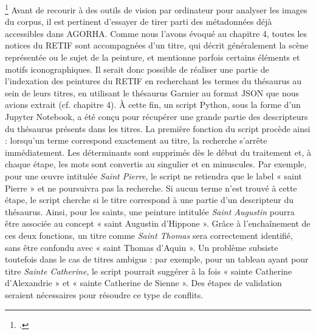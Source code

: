 \footcite{Exploiter les métadonnées existantes}
Avant de recourir à des outils de vision par ordinateur pour analyser les images du corpus, il est pertinent d’essayer de tirer parti des métadonnées déjà accessibles dans AGORHA. Comme nous l’avons évoqué au chapitre 4, toutes les notices du RETIF sont accompagnées d’un titre, qui décrit généralement la scène représentée ou le sujet de la peinture, et mentionne parfois certains éléments et motifs iconographiques. Il serait donc possible de réaliser une partie de l’indexation des peintures du RETIF en recherchant les termes du thésaurus au sein de leurs titres, en utilisant le thésaurus Garnier au format JSON que nous avions extrait (cf. chapitre 4). À cette fin, un script Python, sous la forme d’un Jupyter Notebook, a été conçu pour récupérer une grande partie des descripteurs du thésaurus présents dans les titres. La première fonction du script procède ainsi : lorsqu’un terme correspond exactement au titre, la recherche s’arrête immédiatement. Les déterminants sont supprimés dès le début du traitement et, à chaque étape, les mots sont convertis au singulier et en minuscules. Par exemple, pour une œuvre intitulée \textit{Saint Pierre}, le script ne retiendra que le label « saint Pierre » et ne poursuivra pas la recherche. Si aucun terme n’est trouvé à cette étape, le script cherche si le titre correspond à une partie d’un descripteur du thésaurus. Ainsi, pour les saints, une peinture intitulée \textit{Saint Augustin} pourra être associée au concept « saint Augustin d’Hippone ». Grâce à l’enchaînement de ces deux fonctions, un titre comme \textit{Saint Thomas} sera correctement identifié, sans être confondu avec « saint Thomas d’Aquin ». Un problème subsiste toutefois dans le cas de titres ambigus : par exemple, pour un tableau ayant pour titre \textit{Sainte Catherine}, le script pourrait suggérer à la fois « sainte Catherine d’Alexandrie » et « sainte Catherine de Sienne ». Des étapes de validation seraient nécessaires pour résoudre ce type de conflits.

